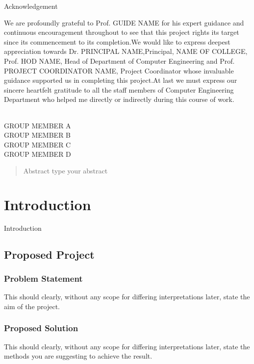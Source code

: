 \documentclass[11pt]{report}
\begin{document}
\begin{Acknowledgements}
\centerline{Acknowledgement}
\par We are profoundly grateful to Prof. GUIDE NAME for his expert guidance and continuous encouragement throughout to see that this project rights its target since its commencement to its completion.We would like to express deepest appreciation towards Dr. PRINCIPAL NAME,Principal, NAME OF COLLEGE, Prof. HOD NAME, Head of Department of Computer Engineering and Prof. PROJECT COORDINATOR NAME, Project Coordinator whose invaluable guidance supported us in completing this project.At last we must express our sincere heartfelt gratitude to all the staff members of Computer Engineering Department who helped me directly or indirectly during this
course of work.


\\GROUP MEMBER A
\\GROUP MEMBER B
\\GROUP MEMBER C
\\GROUP MEMBER D
\end{Acknowledgements}
 
\begin{abstract}
Abstract
type your abstract
\end{abstract}

\tableofcontents





\chapter {Introduction}
\label{intro}
Introduction

\section{Proposed Project}
\subsection{\label{ps}Problem Statement}
This should clearly, without any scope for differing interpretations later, state the aim of the project.
\subsection{Proposed Solution}
This should clearly, without any scope for differing interpretations later, state the methods you are suggesting to achieve the result.
\end{document}
